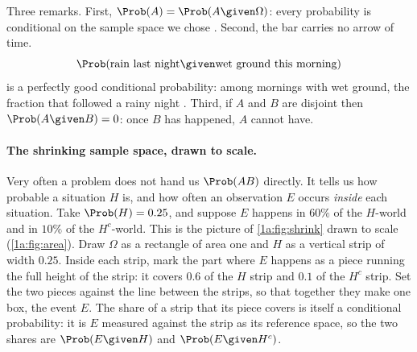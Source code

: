Three remarks. First, $\Prob(A)=\Prob(A\given\Omega)$: every probability is
conditional on the sample space we chose . Second, the
bar carries no arrow of time.
\[
\Prob(\text{rain last night}\given\text{wet ground this morning})
\]
is a perfectly good conditional probability: among mornings with wet ground,
the fraction that followed a rainy night
. Third, if $A$ and $B$ are disjoint then
$\Prob(A\given B)=0$: once $B$ has happened, $A$ cannot have.

\paragraph{The shrinking sample space, drawn to scale.}
Very often a problem does not hand us $\Prob(AB)$ directly. It tells us how
probable a situation $H$ is, and how often an observation $E$ occurs
\emph{inside} each situation. Take $\Prob(H)=0.25$, and suppose $E$ happens in
$60\%$ of the $H$-world and in $10\%$ of the $H^c$-world. This is the picture of
\cref{1a:fig:shrink} drawn to scale (\cref{1a:fig:area}). Draw $\Omega$ as a
rectangle of area one and $H$ as a vertical strip of width $0.25$. Inside each
strip, mark the part where $E$ happens as a piece running the full height of the
strip: it covers $0.6$ of the $H$ strip and $0.1$ of the $H^c$ strip. Set the two
pieces against the line between the strips, so that together they make one box,
the event $E$. The share of a strip that its piece covers is itself a
conditional probability: it is $E$ measured against the strip as its reference
space, so the two shares are $\Prob(E\given H)$ and $\Prob(E\given H^c)$.

